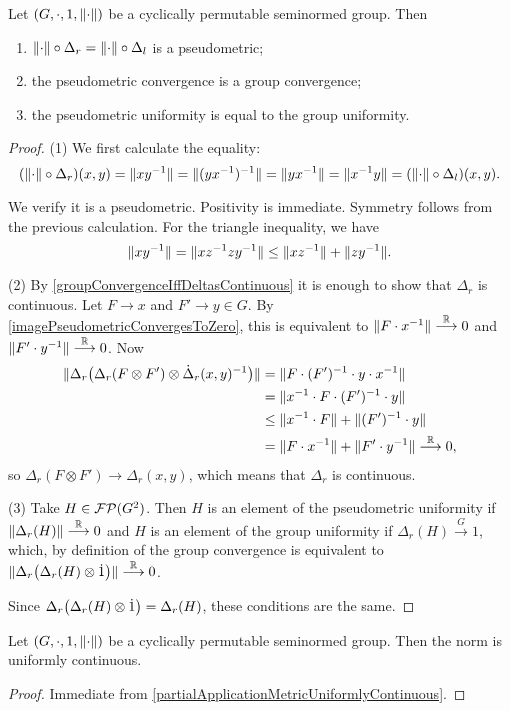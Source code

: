 \begin{proposition} \label{groupSeminormConvergence}
Let $\sSet{G, \cdot, 1, \norm{\cdot}}$ be a cyclically permutable seminormed group. Then 
\begin{enumerate}
\item $\lVert\cdot\rVert\circ \Delta_r = \lVert\cdot\rVert\circ \Delta_l$ is a pseudometric;
\item the pseudometric convergence is a group convergence;
\item the pseudometric uniformity is equal to the group uniformity.
\end{enumerate} 
\end{proposition}
\begin{proof}
(1) We first calculate the equality:
\[ (\lVert\cdot\rVert\circ \Delta_r)(x,y) = \lVert xy^{-1}\rVert = \lVert(yx^{-1})^{-1}\rVert = \lVert yx^{-1}\rVert = \lVert x^{-1}y\rVert = (\lVert\cdot\rVert\circ \Delta_l)(x,y). \]

We verify it is a pseudometric. Positivity is immediate. Symmetry follows from the previous calculation. For the triangle inequality, we have
\[ \lVert xy^{-1}\rVert = \lVert xz^{-1}zy^{-1}\rVert \leq \lVert xz^{-1}\rVert + \lVert zy^{-1}\rVert. \]

(2) By \ref{groupConvergenceIffDeltasContinuous} it is enough to show that $\Delta_r$ is continuous. Let $F\to x$ and $F'\to y\in G$. By \ref{imagePseudometricConvergesToZero}, this is equivalent to $\lVert F\cdot x^{-1}\rVert \overset{\mathbb{R}}{\longrightarrow} 0$ and $\lVert F'\cdot y^{-1}\rVert \overset{\mathbb{R}}{\longrightarrow} 0$. Now
\begin{align*}
\lVert\Delta_r\big(\Delta_r(F\otimes F')\otimes \dot\Delta_r(x,y)^{-1}\big)\rVert &= \lVert F\cdot (F')^{-1}\cdot y\cdot x^{-1}\rVert \\
&= \lVert x^{-1}\cdot F\cdot (F')^{-1}\cdot y\rVert \\
&\leq \lVert x^{-1}\cdot F\rVert+ \lVert(F')^{-1}\cdot y\rVert \\
&= \lVert F\cdot x^{-1}\rVert + \lVert F'\cdot y^{-1}\rVert \overset{\mathbb{R}}{\longrightarrow} 0,
\end{align*}
so $\Delta_r(F\otimes F')\to \Delta_r(x,y)$, which means that $\Delta_r$ is continuous.

(3) Take $H\in\operatorname{\mathcal{FP}}(G^2)$. Then $H$ is an element of the pseudometric uniformity if $\lVert\Delta_r(H)\rVert\overset{\mathbb{R}}{\longrightarrow} 0$ and $H$ is an element of the group uniformity if $\Delta_r(H)\overset{G}{\longrightarrow} 1$, which, by definition of the group convergence is equivalent to $\lVert\Delta_r\big(\Delta_r(H)\otimes\dot{1}\big)\rVert\overset{\mathbb{R}}{\longrightarrow} 0$.

Since $\Delta_r\big(\Delta_r(H)\otimes\dot{1}\big) = \Delta_r(H)$, these conditions are the same.
\end{proof}
\begin{corollary} \label{normUniformlyContinuous}
Let $\sSet{G, \cdot, 1, \norm{\cdot}}$ be a cyclically permutable seminormed group. Then the norm is uniformly continuous.
\end{corollary}
\begin{proof}
Immediate from \ref{partialApplicationMetricUniformlyContinuous}.
\end{proof}

